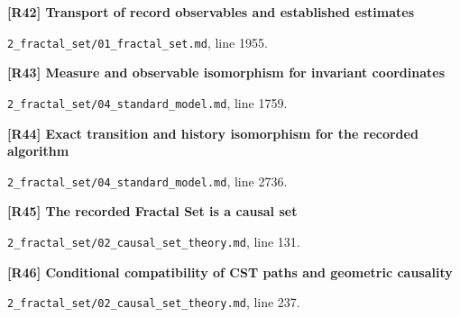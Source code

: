 \documentclass[11pt,a4paper]{article}
\begin{document}
\par\medskip\noindent\begin{minipage}{\linewidth}\textbf{[R42] Transport of record observables and established estimates}\label{src:prop-fractal-set-analytic-transfer}\par
{\small\texttt{}\par
\nolinkurl{2_fractal_set/01_fractal_set.md}, line 1955.\par}
\end{minipage}\par

\par\medskip\noindent\begin{minipage}{\linewidth}\textbf{[R43] Measure and observable isomorphism for invariant coordinates}\label{src:thm-sm-direct-measure-isomorphism}\par
{\small\texttt{}\par
\nolinkurl{2_fractal_set/04_standard_model.md}, line 1759.\par}
\end{minipage}\par

\par\medskip\noindent\begin{minipage}{\linewidth}\textbf{[R44] Exact transition and history isomorphism for the recorded algorithm}\label{src:thm-sm-instantiated-record-transition}\par
{\small\texttt{}\par
\nolinkurl{2_fractal_set/04_standard_model.md}, line 2736.\par}
\end{minipage}\par

\par\medskip\noindent\begin{minipage}{\linewidth}\textbf{[R45] The recorded Fractal Set is a causal set}\label{src:thm-fractal-is-causal-set}\par
{\small\texttt{}\par
\nolinkurl{2_fractal_set/02_causal_set_theory.md}, line 131.\par}
\end{minipage}\par

\par\medskip\noindent\begin{minipage}{\linewidth}\textbf{[R46] Conditional compatibility of CST paths and geometric causality}\label{src:prop-fractal-causal-order-equivalence}\par
{\small\texttt{}\par
\nolinkurl{2_fractal_set/02_causal_set_theory.md}, line 237.\par}
\end{minipage}\par
\end{document}
